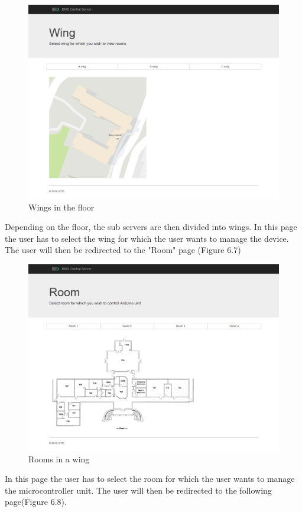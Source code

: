 \documentclass[letterpaper,11pt]{report}
\begin{document}
\newpage

\begin{figure}[h]
\includegraphics[width=\textwidth]{wing}
\centering
\captionsetup{justification=centering}
\caption{Wings in the floor}
\label{fig:wing}
\end{figure}
Depending on the floor, the sub servers are then divided into wings. In this page the user has to select the wing for which the user wants to manage the device. The user will then be redirected to the "Room" page (Figure 6.7)

\begin{figure}[h]
\includegraphics[width=\textwidth]{room}
\centering
\captionsetup{justification=centering}
\caption{Rooms in a wing}
\label{fig:room}
\end{figure}
In this page the user has to select the room for which the user wants to manage the microcontroller unit. The user will then be redirected to the following page(Figure 6.8).
\end{document}
